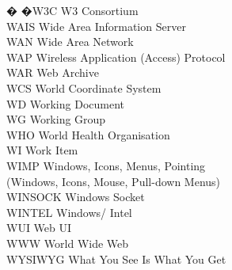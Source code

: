 \begin{tabbing}
 � �\>W3C \>\>W3 Consortium\\

    \>WAIS \>\>Wide Area Information Server\\

    \>WAN \>\>Wide Area Network\\

    \>WAP \>\>Wireless Application (Access) Protocol\\

    \>WAR \>\>Web Archive\\

    \>WCS \>\>World Coordinate System\\

    \>WD \>\>Working Document\\

    \>WG \>\>Working Group\\

    \>WHO \>\>World Health Organisation\\


    \>WI \>\>Work Item\\

    \>WIMP \>\>Windows, Icons, Menus, Pointing\\
        \>\>\>(Windows, Icons, Mouse, Pull-down Menus)\\

    \>WINSOCK \>\>Windows Socket\\

    \>WINTEL \>\>Windows/ Intel\\





    \>WUI \>\>Web UI\\

    \>WWW \>\>World Wide Web\\

    \>WYSIWYG \>\>What You See Is What You Get\\


\end{tabbing}
